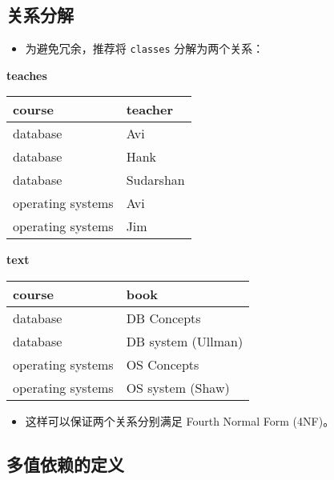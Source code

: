 \subsection{关系分解}

\begin{itemize}
    \item 为避免冗余，推荐将 \texttt{classes} 分解为两个关系：
\end{itemize}

\begin{minipage}{0.45\linewidth}
\centering
\textbf{teaches}
\begin{tabular}{|l|l|}
\hline
\textbf{course} & \textbf{teacher} \\
\hline
database & Avi \\
database & Hank \\
database & Sudarshan \\
operating systems & Avi \\
operating systems & Jim \\
\hline
\end{tabular}
\end{minipage}
\hfill
\begin{minipage}{0.45\linewidth}
\centering
\textbf{text}
\begin{tabular}{|l|l|}
\hline
\textbf{course} & \textbf{book} \\
\hline
database & DB Concepts \\
database & DB system (Ullman) \\
operating systems & OS Concepts \\
operating systems & OS system (Shaw) \\
\hline
\end{tabular}
\end{minipage}

\begin{itemize}
    \item 这样可以保证两个关系分别满足 Fourth Normal Form (4NF)。
\end{itemize}

\subsection{多值依赖的定义}

